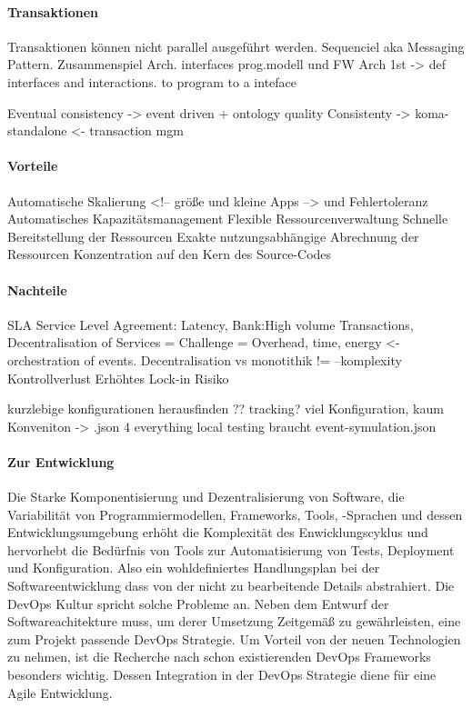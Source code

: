 \documentclass[
12pt,
english,
ngerman,
headsepline,
twoside,
openright,
numbers=noenddot,version=first
]{scrreprt}
\begin{document}
\paragraph{Transaktionen}
Transaktionen können nicht parallel ausgeführt werden. Sequenciel aka Messaging Pattern.
Zusammenspiel Arch. interfaces prog.modell und FW
Arch 1st -> def interfaces and interactions. to program to a inteface


Eventual consistency -> event driven + ontology quality
Consistenty -> koma-standalone <- transaction mgm

\paragraph{Vorteile}
Automatische Skalierung <!-- größe und kleine Apps --> und Fehlertoleranz
Automatisches Kapazitätsmanagement
Flexible Ressourcenverwaltung
Schnelle Bereitstellung der Ressourcen
Exakte nutzungsabhängige Abrechnung der Ressourcen
Konzentration auf den Kern des Source-Codes


\paragraph{Nachteile}


SLA Service Level Agreement: Latency, Bank:High volume Transactions,
Decentralisation of Services = Challenge = Overhead, time, energy <- orchestration of events.
Decentralisation vs monotithik != --komplexity
Kontrollverlust
Erhöhtes Lock-in Risiko

kurzlebige konfigurationen herausfinden ?? tracking?
viel Konfiguration, kaum Konveniton -> .json 4 everything
local testing braucht event-symulation.json



\paragraph{Zur Entwicklung}
Die Starke Komponentisierung und Dezentralisierung von Software, die Variabilität von Programmiermodellen, Frameworks, Tools, -Sprachen und dessen Entwicklungsumgebung erhöht die Komplexität des Enwicklungscyklus und hervorhebt die Bedürfnis von Tools zur Automatisierung von Tests, Deployment und Konfiguration. Also ein wohldefiniertes Handlungsplan bei der Softwareentwicklung dass von der nicht zu bearbeitende Details abstrahiert. 
Die DevOps Kultur spricht solche Probleme an. Neben dem Entwurf der Softwareachitekture  muss, um derer Umsetzung Zeitgemäß zu gewährleisten, eine zum Projekt passende DevOps Strategie.
Um Vorteil von der neuen Technologien zu nehmen, ist die Recherche nach schon existierenden DevOps Frameworks besonders wichtig. Dessen Integration in der DevOps Strategie diene für eine Agile Entwicklung.
\end{document}
